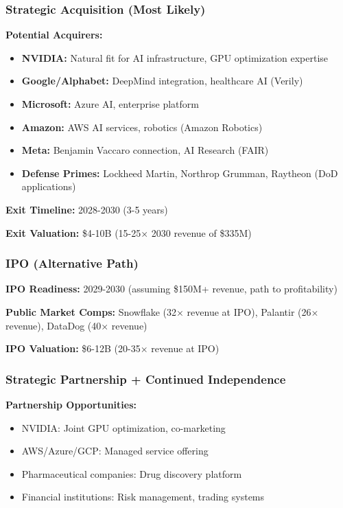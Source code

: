 \documentclass[11pt,letterpaper]{article}
\begin{document}
\subsubsection{Strategic Acquisition (Most Likely)}

\textbf{Potential Acquirers:}
\begin{itemize}
    \item \textbf{NVIDIA:} Natural fit for AI infrastructure, GPU optimization expertise
    \item \textbf{Google/Alphabet:} DeepMind integration, healthcare AI (Verily)
    \item \textbf{Microsoft:} Azure AI, enterprise platform
    \item \textbf{Amazon:} AWS AI services, robotics (Amazon Robotics)
    \item \textbf{Meta:} Benjamin Vaccaro connection, AI Research (FAIR)
    \item \textbf{Defense Primes:} Lockheed Martin, Northrop Grumman, Raytheon (DoD applications)
\end{itemize}

\textbf{Exit Timeline:} 2028-2030 (3-5 years)

\textbf{Exit Valuation:} \$4-10B (15-25× 2030 revenue of \$335M)

\subsubsection{IPO (Alternative Path)}

\textbf{IPO Readiness:} 2029-2030 (assuming \$150M+ revenue, path to profitability)

\textbf{Public Market Comps:} Snowflake (32× revenue at IPO), Palantir (26× revenue), DataDog (40× revenue)

\textbf{IPO Valuation:} \$6-12B (20-35× revenue at IPO)

\subsubsection{Strategic Partnership + Continued Independence}

\textbf{Partnership Opportunities:}
\begin{itemize}
    \item NVIDIA: Joint GPU optimization, co-marketing
    \item AWS/Azure/GCP: Managed service offering
    \item Pharmaceutical companies: Drug discovery platform
    \item Financial institutions: Risk management, trading systems
\end{itemize}
\end{document}

